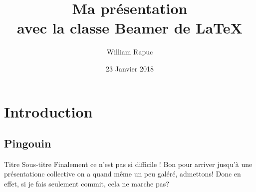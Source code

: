 \documentclass[usenames,dvipsnames, 12pt]{beamer}
\title{Ma présentation \\avec la classe Beamer de \LaTeX}
\author{William Rapuc}
\institute{EDYTEM}
\date{23 Janvier 2018}
\begin{document}
\section{Introduction}
\subsection{Pingouin}

 \begin{frame}
 \titlepage
 \end{frame}
 \begin{frame}{Titre }{Sous-titre}
  Finalement ce n'est pas si difficile ! Bon pour arriver jusqu'à une présentationc collective on a quand même un peu galéré, admettons!
  Donc en effet, si je fais seulement commit, cela ne marche pas?
  	\end{frame}
\end{document}
